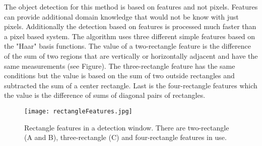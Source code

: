 The object detection for this method is based on features and not pixels. Features can provide additional domain knowledge that would not be know with just pixels. Additionally the detection based on features is processed much faster than a pixel based system. The algorithm uses three different simple features based on the "Haar" basis functions. The value of a two-rectangle feature is the difference of the sum of two regions that are vertically or horizontally adjacent and have the same measurements (see Figure). The three-rectangle feature has the same conditions but the value is based on the sum of two outside rectangles and subtracted the sum of a center rectangle. Last is the four-rectangle features which the value is the difference of sums of diagonal pairs of rectangles.
\begin{figure}[H]
	\centering
	\texttt{[image: rectangleFeatures.jpg]}
	\caption{Rectangle features in a detection window. There are two-rectangle (A and B), three-rectangle (C) and four-rectangle features in use.}
	\label{fig:rectFeat}
\end{figure}

